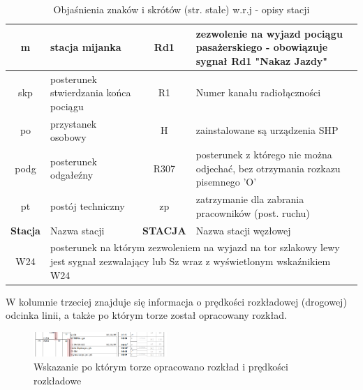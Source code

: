 \begin{table}
	\begin{tabular}{|c|m{4cm}|c|m{4cm}|}
		\hline 
		m & stacja mijanka & Rd1 & zezwolenie na wyjazd pociągu pasażerskiego - obowiązuje sygnał Rd1 "Nakaz Jazdy" \\ 
		\hline
		skp & posterunek stwierdzania końca pociągu & R1& Numer kanału radiołączności\\ 
		\hline
		po	& przystanek osobowy & H & zainstalowane są urządzenia SHP\\ 
		\hline
		podg	& posterunek odgałeźny &  R307	& posterunek z którego nie można odjechać, bez otrzymania rozkazu pisemnego 'O'\\ 
		\hline
		pt	& postój techniczny & zp & zatrzymanie dla zabrania pracowników (post. ruchu)\\ 
		\hline
		\textbf{Stacja}	& Nazwa stacji & \textbf{STACJA} & Nazwa stacji węzłowej \\ 
		\hline
		W24	& \multicolumn{3}{m{9cm}|}{posterunek na którym zezwoleniem na wyjazd na tor szlakowy lewy jest sygnał zezwalający lub Sz wraz z wyświetlonym wskaźnikiem W24} \\
		\hline
	\end{tabular} 
	\caption{Objaśnienia znaków i skrótów (str. stałe) w.r.j - opisy stacji}
\end{table}
W kolumnie trzeciej znajduje się informacja o prędkości rozkładowej (drogowej) odcinka linii, a także po którym torze został opracowany rozkład.
\begin{figure}
	\includegraphics[width=0.45\textwidth]{skryptkierownik-img/tor-lewy.png}
	\caption{Wskazanie po którym torze opracowano rozkład i prędkości rozkładowe}
\end{figure}

